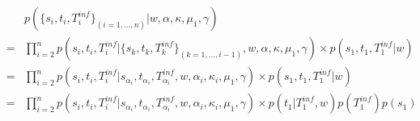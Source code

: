 \documentclass[10pt]{article}
\begin{document}
\begin{eqnarray}
& & p(\{s_i, t_i, T_i^{inf}\}_{(i=1,\ldots,n)}|  w,  \alpha, \kappa, \mu_1, \gamma) \\
& = & \prod_{i=2}^n p(s_i, t_i, T_i^{inf} | \{s_k, t_k, T_k^{inf} \}_{(k=1,\ldots,i-1)}, w,  \alpha, \kappa, \mu_1, \gamma) 
  \times p(s_1, t_1, T_1^{inf}|w)\\
& = & \prod_{i=2}^n p(s_i, t_i, T_i^{inf}| s_{\alpha_i}, t_{\alpha_i}, T_{\alpha_i}^{inf},  w,  \alpha_i, \kappa_i, \mu_1, \gamma) 
  \times p(s_1, t_1 , T_1^{inf}|w)\\
& = & \prod_{i=2}^n p(s_i, t_i, T_i^{inf}| s_{\alpha_i}, t_{\alpha_i}, T_{\alpha_i}^{inf},  w,  \alpha_i, \kappa_i, \mu_1, \gamma) 
  \times p(t_1 | T_1^{inf},w) p(T_1^{inf}) p(s_1) 
\end{eqnarray}
\end{document}
